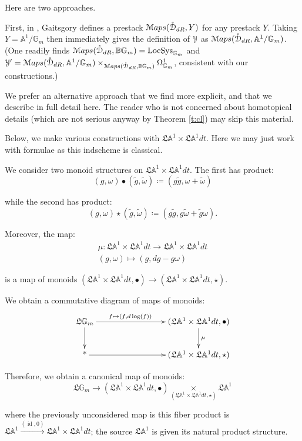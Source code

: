 \documentclass[reqno,11pt]{amsart}
\numberwithin{equation}{subsection}
\theoremstyle{remark}
\newcommand{\xar}[1]{\xrightarrow{#1}}
\newcommand{\bA}{{\mathbb A}}
\newcommand{\bB}{{\mathbb B}}
\newcommand{\bG}{{\mathbb G}}
\newcommand{\sD}{{\EuScript D}}
\newcommand{\sM}{{\EuScript M}}
\newcommand{\sY}{{\EuScript Y}}
\newcommand{\fL}{{\mathfrak L}}
\newcommand{\on}{\operatorname}
\newcommand{\id}{\on{id}}
\renewcommand{\dot}{\bullet}
\newcommand{\LocSys}{\on{LocSys}}
\newcommand{\Maps}{\sM aps}
\renewcommand{\o}[1]{\mathring{#1}}
\begin{document}
Here are two approaches. 

First, in \cite{dennis-punctured-disc}, 
Gaitsgory defines a prestack $\Maps(\o{\sD}_{dR},Y)$ for any 
prestack $Y$. Taking $Y = \bA^1/\bG_m$ then immediately gives the definition
of $\sY$ as $\Maps(\o{\sD}_{dR},\bA^1/\bG_m)$. (One readily
finds $\Maps(\o{\sD}_{dR},\bB \bG_m) = \LocSys_{\bG_m}$ and
$\sY^{\prime} = \Maps(\o{\sD}_{dR},\bA^1/\bG_m) 
\times_{\Maps(\o{\sD}_{dR},\bB \bG_m)} \Omega_{\bG_m}^1$, consistent
with our constructions.)

We prefer an alternative approach that we find more explicit, and that we
describe in full detail here. The reader who is not concerned about
homotopical details (which are not serious anyway by Theorem \ref{t:cl})
may skip this material.

Below, we make various constructions with $\fL \bA^1 \times \fL \bA^1 dt$. Here we may
just work with formulae as this indscheme is classical.

We consider two monoid structures on $\fL \bA^1 \times \fL \bA^1 dt$. 
The first has product:
%
\[
(g,\omega) \dot (\tilde{g},\tilde{\omega}) \coloneqq 
(g\tilde{g},\omega+\tilde{\omega})
\]

\noindent while the second has product:
%
\[
(g,\omega) \star (\tilde{g},\tilde{\omega}) \coloneqq 
(g\tilde{g},g\tilde{\omega}+\tilde{g}\omega).
\]

\noindent Moreover, the map:
%
\[
\begin{gathered}
\mu:\fL \bA^1 \times \fL \bA^1 dt \to \fL \bA^1 \times \fL \bA^1 dt \\
(g,\omega) \mapsto (g,dg-g\omega)
\end{gathered}
\]

\noindent is a map of monoids $(\fL \bA^1 \times \fL \bA^1 dt,\dot) \to 
(\fL \bA^1 \times \fL \bA^1 dt,\star)$.

We obtain a commutative diagram of maps of monoids:
%
\[
\xymatrix{
\fL \bG_m \ar[rrr]^(.4){f \mapsto (f,d\log(f))} 
\ar[d] &&& (\fL \bA^1 \times \fL \bA^1 dt,\dot) \ar[d]^{\mu} \\
\on{*} \ar[rrr] &&& (\fL \bA^1 \times \fL \bA^1 dt,\star)
}
\]

Therefore, we obtain a canonical map of monoids:
%
\[
\fL \bG_m \to (\fL \bA^1 \times \fL \bA^1 dt,\dot) 
\underset{(\fL \bA^1 \times \fL \bA^1 dt,\star)}{\times}
\fL \bA^1
\]

\noindent where the previously unconsidered map is this
fiber product is $\fL \bA^1 \xar{(\id,0)} \fL \bA^1 \times \fL \bA^1 dt$; the source $\fL \bA^1$ is given its natural
product structure. 
\end{document}
